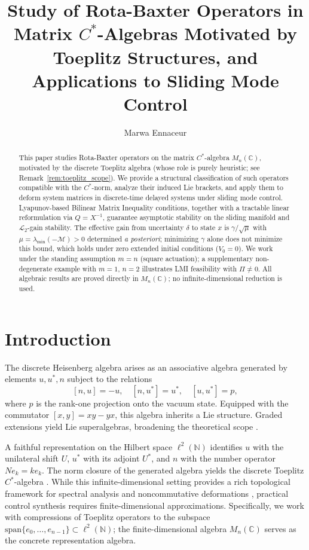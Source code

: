 \documentclass[10pt]{amsart}
\title[Rota-Baxter Operators in Discrete Control]{Study of Rota-Baxter Operators in Matrix $C^*$-Algebras Motivated by Toeplitz Structures, and Applications to Sliding Mode Control}
\author{Marwa Ennaceur}
\numberwithin{equation}{section}
\begin{document}
\begin{abstract}
This paper studies Rota-Baxter operators on the matrix $C^*$-algebra $M_n(\mathbb{C})$,
motivated by the discrete Toeplitz algebra (whose role is purely heuristic; see
Remark~\ref{rem:toeplitz_scope}). We provide a structural classification of such
operators compatible with the $C^*$-norm, analyze their induced Lie brackets, and
apply them to deform system matrices in discrete-time delayed systems under sliding
mode control. Lyapunov-based Bilinear Matrix Inequality conditions, together with a
tractable linear reformulation via $Q=X^{-1}$, guarantee asymptotic stability on the
sliding manifold and $\mathcal{L}_2$-gain stability. The effective gain from
uncertainty $\delta$ to state $x$ is $\gamma/\sqrt{\mu}$ with
$\mu=\lambda_{\min}(-\mathcal{M})>0$ determined \emph{a posteriori}; minimizing
$\gamma$ alone does not minimize this bound, which holds under zero extended initial
conditions ($V_0=0$). We work under the standing assumption $m=n$ (square actuation);
a supplementary non-degenerate example with $m=1$, $n=2$ illustrates LMI feasibility
with $\Pi\neq0$. All algebraic results are proved directly in $M_n(\mathbb{C})$; no
infinite-dimensional reduction is used.
\end{abstract}
\maketitle
\tableofcontents


\section{Introduction}\label{sec:intro}
The discrete Heisenberg algebra arises as an associative algebra generated by elements
\(u, u^*, n\) subject to the relations
\[
[n, u] = -u, \quad [n, u^*] = u^*, \quad [u, u^*] = p,
\]
where \(p\) is the rank-one projection onto the vacuum state. Equipped with the
commutator \([x,y]=xy-yx\), this algebra inherits a Lie structure. Graded extensions
yield Lie superalgebras, broadening the theoretical scope \cite{Guo2012, Bai2019}.

A faithful representation on the Hilbert space \(\ell^2(\mathbb{N})\) identifies \(u\)
with the unilateral shift \(U\), \(u^*\) with its adjoint \(U^*\), and \(n\) with the
number operator \(N e_k = k e_k\). The norm closure of the generated algebra yields the
discrete Toeplitz \(C^*\)-algebra \cite{Douglas1998}. While this infinite-dimensional
setting provides a rich topological framework for spectral analysis and noncommutative
deformations \cite{Connes1994, Arveson1976}, practical control synthesis requires
finite-dimensional approximations. Specifically, we work with compressions of Toeplitz
operators to the subspace $\mathrm{span}\{e_0,\ldots,e_{n-1}\} \subset \ell^2(\mathbb{N})$;
the finite-dimensional algebra $M_n(\mathbb{C})$ serves as the concrete representation
algebra.
\end{document}
